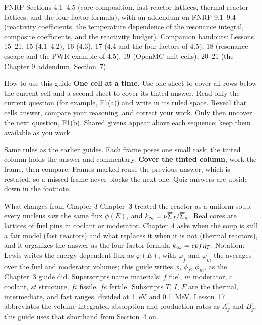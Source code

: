 \documentclass[compact]{ne630handout}
\newcommand{\MeV}[1]{\SI{#1}{\mega\electronvolt}}
\newcommand{\eV}[1]{\SI{#1}{\electronvolt}}
\newcommand{\etaT}{\eta_T}
\begin{document}
 {FNRP Sections 4.1--4.5 (core composition, fast reactor lattices, thermal reactor lattices, and the four factor formula), with an addendum on FNRP 9.1--9.4 (reactivity coefficients, the temperature dependence of the resonance integral, composite coefficients, and the reactivity budget). Companion handouts: Lessons 15--21.}
 {15 (4.1--4.2), 16 (4.3), 17 (4.4 and the four factors of 4.5), 18 (resonance escape and the PWR example of 4.5), 19 (OpenMC unit cells), 20--21 (the Chapter 9 addendum, Section~7).}

\begin{KeyBox}{How to use this guide}
\ifguidehandwriting
\textbf{One cell at a time.} Use one sheet to cover all rows below the current cell and a second sheet to cover its tinted answer. Read only the current question (for example, F1(a)) and write in its ruled space. Reveal that cell\textquotesingle s answer, compare your reasoning, and correct your work. Only then uncover the next question, F1(b). Shared givens appear above each sequence; keep them available as you work.\par\smallskip
\fi
Same rules as the earlier guides. Each frame poses one small task; the tinted column holds the answer and commentary. \textbf{Cover the tinted column}, work the frame, then compare. Frames marked \Chain reuse the previous answer, which is restated, so a missed frame never blocks the next one. Quiz answers are upside down in the footnote.
\end{KeyBox}

\begin{KeyBox}{What changes from Chapter 3}
Chapter~3 treated the reactor as a uniform soup: every nucleus saw the same flux $\phi(E)$, and $k_\infty=\nu\overline\Sigma_f/\overline\Sigma_a$. Real cores are lattices of fuel pins in coolant or moderator. Chapter~4 asks when the soup is still a fair model (fast reactors) and what replaces it when it is not (thermal reactors), and it organizes the answer as the four factor formula $\kinf=\epsilon p f\etaT$. Notation: Lewis writes the energy-dependent flux as $\varphi(E)$, with $\varphi_f$ and $\varphi_m$ the averages over the fuel and moderator volumes; this guide writes $\phi$, $\phi_f$, $\phi_m$, as the Chapter~3 guide did. Superscripts name materials: $f$ fuel, $m$ moderator, $c$ coolant, $st$ structure, $fi$ fissile, $fe$ fertile. Subscripts $T$, $I$, $F$ are the thermal, intermediate, and fast ranges, divided at \eV{1} and \MeV{0.1}. Lesson~17 abbreviates the volume-integrated absorption and production rates as $A_g^r$ and $B_g^r$; this guide uses that shorthand from Section~4 on.
\end{KeyBox}
\end{document}
